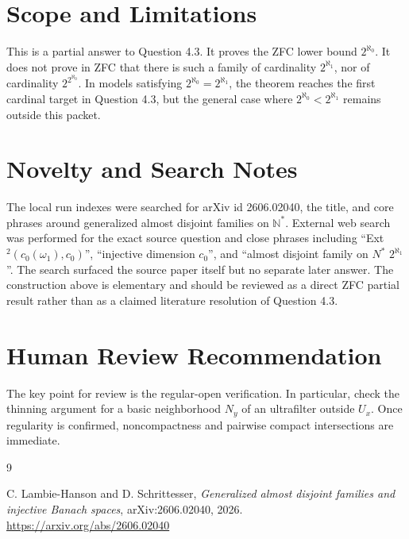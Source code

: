 \documentclass[11pt]{article}
\begin{document}
\section*{Scope and Limitations}

This is a partial answer to Question 4.3. It proves the ZFC lower bound
\(2^{\aleph_0}\). It does not prove in ZFC that there is such a family of
cardinality \(2^{\aleph_1}\), nor of cardinality \(2^{2^{\aleph_0}}\). In
models satisfying \(2^{\aleph_0}=2^{\aleph_1}\), the theorem reaches the first
cardinal target in Question 4.3, but the general case where
\(2^{\aleph_0}<2^{\aleph_1}\) remains outside this packet.

\section*{Novelty and Search Notes}

The local run indexes were searched for arXiv id 2606.02040, the title, and
core phrases around generalized almost disjoint families on \(\mathbb N^*\).
External web search was performed for the exact source question and close
phrases including ``Ext\({}^2(c_0(\omega_1),c_0)\)'', ``injective dimension
\(c_0\)'', and ``almost disjoint family on \(N^*\) \(2^{\aleph_1}\)''. The
search surfaced the source paper itself but no separate later answer. The
construction above is elementary and should be reviewed as a direct ZFC
partial result rather than as a claimed literature resolution of Question 4.3.

\section*{Human Review Recommendation}

The key point for review is the regular-open verification. In particular,
check the thinning argument for a basic neighborhood \(N_y\) of an ultrafilter
outside \(U_x\). Once regularity is confirmed, noncompactness and pairwise
compact intersections are immediate.

\begin{thebibliography}{9}

C. Lambie-Hanson and D. Schrittesser,
\emph{Generalized almost disjoint families and injective Banach spaces},
arXiv:2606.02040, 2026.
\url{https://arxiv.org/abs/2606.02040}

\end{thebibliography}
\end{document}
